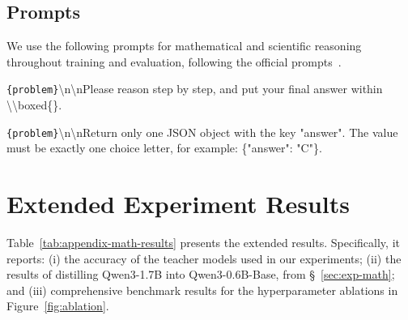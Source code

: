 \documentclass{article}
\begin{document}
\subsection{Prompts}
We use the following prompts for mathematical and scientific reasoning throughout training and evaluation, following the official prompts~\citep{yang2025qwen3}.
\begin{tcolorbox}[
    colback=gray!5,
    colframe=gray!50,
    title=\textbf{Math Reasoning Prompt Template},
    fonttitle=\bfseries,
    boxrule=0.5pt,
    arc=2pt,
]
\small
\texttt{\{problem\}}\textbackslash n\textbackslash nPlease reason step by step, and put your final answer within \textbackslash \textbackslash boxed\{\}.

\vspace{0.5em}

\end{tcolorbox}


\begin{tcolorbox}[
    colback=gray!5,
    colframe=gray!50,
    title=\textbf{Scientific Reasoning Prompt Template},
    fonttitle=\bfseries,
    boxrule=0.5pt,
    arc=2pt,
]
\small
\texttt{\{problem\}}\textbackslash n\textbackslash nReturn only one JSON object with the key "answer". The value must be exactly one choice letter, for example: \{"answer": "C"\}.
\end{tcolorbox}

\section{Extended Experiment Results}
Table~\ref{tab:appendix-math-results} presents the extended results. Specifically, it reports: (i) the accuracy of the teacher models used in our experiments; (ii) the results of distilling Qwen3-1.7B into Qwen3-0.6B-Base, from \S~\ref{sec:exp-math}; and (iii) comprehensive benchmark results for the hyperparameter ablations in Figure~\ref{fig:ablation}.
\end{document}
